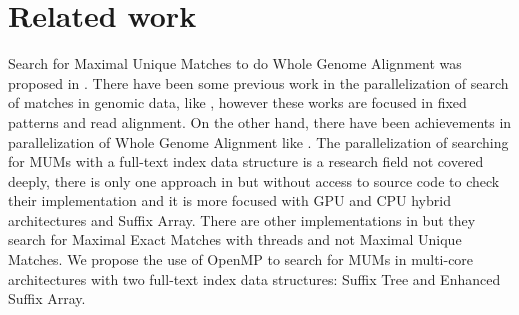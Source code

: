 \documentclass[runningheads,a5paper]{llncs}
\begin{document}
\section{Related work}
Search for Maximal Unique Matches to do Whole Genome Alignment was proposed in \cite{Delcher1999}. There have been some previous work in the parallelization of search of matches in genomic data, like \cite{OguzhanKulekci2011,Mongelli,Kouzinopoulos2005}, however these works are focused in fixed patterns and read alignment. On the other hand, there have been achievements in parallelization of Whole Genome Alignment like \cite{Meng2005}. The parallelization of searching for MUMs with a full-text index data structure is a research field not covered deeply, there is only one approach in \cite{Encarnac2011} but without access to source code to check their implementation and it is more focused with GPU and CPU hybrid architectures and Suffix Array. There are other implementations in \cite{Vyverman2013,OguzhanKulekci2011,Khan2009,OhlebuschGK10} but they search for Maximal Exact Matches with threads and not Maximal Unique Matches. We propose the use of OpenMP to search for MUMs in multi-core architectures with two full-text index data structures: Suffix Tree and Enhanced Suffix Array.
\end{document}
